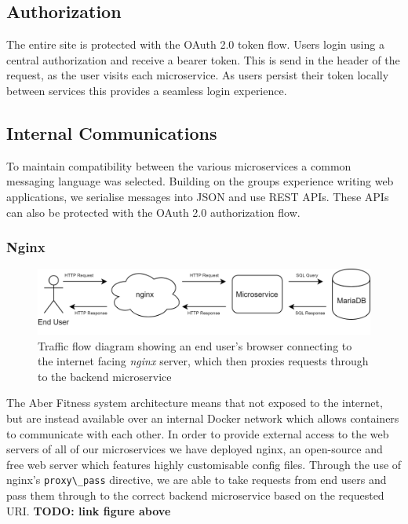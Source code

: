 \subsection{Authorization}
    \par
    The entire site is protected with the OAuth 2.0 token flow. Users login using a central authorization and receive a bearer token. This is send in the header of the request, as the user visits each microservice. As users persist their token locally between services this provides a seamless login experience.

\subsection{Internal Communications}
    \par
    To maintain compatibility between the various microservices a common messaging language was selected. Building on the groups experience writing web applications, we serialise messages into JSON and use REST APIs. These APIs can also be protected with the OAuth 2.0 authorization flow.

\subsubsection{Nginx}
    \begin{figure}[H]
        \centering
        \includegraphics[width=\textwidth]{Images/nginx_proxy_flow.png}
        \caption{Traffic flow diagram showing an end user's browser connecting to the internet facing \textit{nginx} server, which then proxies requests through to the backend microservice}
    \end{figure}
    
    The Aber Fitness system architecture means that not exposed to the internet, but are instead available over an internal Docker network which allows containers to communicate with each other. In order to provide external access to the web servers of all of our microservices we have deployed nginx, an open-source and free web server which features highly customisable config files. Through the use of nginx's \lstinline{proxy\_pass} directive, we are able to take requests from end users and pass them through to the correct backend microservice based on the requested URI. \textbf{TODO: link figure above}
    

